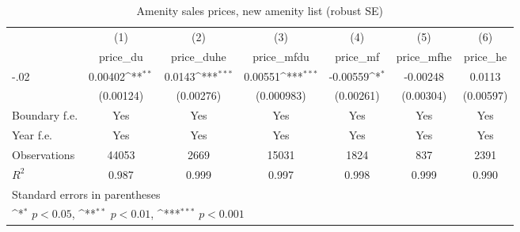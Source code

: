 \begin{table}[htbp]\centering
\def\sym#1{\ifmmode^{#1}\else\(^{#1}\)\fi}
\caption{Amenity sales prices, new amenity list (robust SE)}
\begin{tabular}{l*{6}{c}}
\hline\hline
                    &\multicolumn{1}{c}{(1)}&\multicolumn{1}{c}{(2)}&\multicolumn{1}{c}{(3)}&\multicolumn{1}{c}{(4)}&\multicolumn{1}{c}{(5)}&\multicolumn{1}{c}{(6)}\\
                    &\multicolumn{1}{c}{price\_du}&\multicolumn{1}{c}{price\_duhe}&\multicolumn{1}{c}{price\_mfdu}&\multicolumn{1}{c}{price\_mf}&\multicolumn{1}{c}{price\_mfhe}&\multicolumn{1}{c}{price\_he}\\
\hline
-.02                &     0.00402\sym{**} &      0.0143\sym{***}&     0.00551\sym{***}&    -0.00559\sym{*}  &    -0.00248         &      0.0113         \\
                    &   (0.00124)         &   (0.00276)         &  (0.000983)         &   (0.00261)         &   (0.00304)         &   (0.00597)         \\
[1em]
Boundary f.e.       &         Yes         &         Yes         &         Yes         &         Yes         &         Yes         &         Yes         \\
[1em]
Year f.e.           &         Yes         &         Yes         &         Yes         &         Yes         &         Yes         &         Yes         \\
\hline
Observations        &       44053         &        2669         &       15031         &        1824         &         837         &        2391         \\
\(R^{2}\)           &       0.987         &       0.999         &       0.997         &       0.998         &       0.999         &       0.990         \\
\hline\hline
\multicolumn{7}{l}{\footnotesize Standard errors in parentheses}\\
\multicolumn{7}{l}{\footnotesize \sym{*} \(p<0.05\), \sym{**} \(p<0.01\), \sym{***} \(p<0.001\)}\\
\end{tabular}
\end{table}
